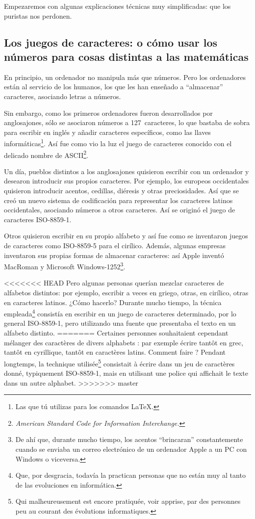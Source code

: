 Empezaremos con algunas explicaciones técnicas muy simplificadas: que los puristas nos perdonen.

\subsection{Los juegos de caracteres: o cómo usar los números para cosas distintas a las matemáticas}

En principio, un ordenador no manipula más que números. Pero los ordenadores están al servicio de los humanos, los que les han enseñado a \enquote{almacenar} caracteres, asociando letras a números.

Sin embargo, como los primeros ordenadores fueron desarrollados por anglosajones, sólo se asociaron números a 127~caracteres, lo que bastaba de sobra para escribir en inglés y añadir caracteres específicos, como las llaves informáticas\footnote{Las que tú utilizas para los comandos \LaTeX.}.  Así fue como vio la luz el juego de caracteres conocido con el delicado nombre de ASCII\footnote{\emph{\textenglish{American Standard Code for Information Interchange.}}}.

Un día, pueblos distintos a los anglosajones quisieron escribir con un ordenador y desearon introducir sus propios caracteres. Por ejemplo, los europeos occidentales quisieron introducir acentos, cedillas, diéresis y otras preciosidades. Así que se creó un nuevo sistema de codificación para representar los caracteres latinos occidentales, asociando números a otros caracteres. Así se originó el juego de caracteres  ISO-8859-1. 

Otros quisieron escribir en su propio alfabeto y así fue como se inventaron juegos de caracteres como ISO-8859-5 para el cirílico. Además, algunas empresas inventaron sus propias formas de almacenar caracteres:  así Apple inventó MacRoman y Microsoft Windows-1252\footnote{De ahí que, durante mucho tiempo, los acentos \enquote{brincaran} constantemente cuando se enviaba un correo electrónico de un ordenador Apple a un PC con Windows o viceversa.}. 

<<<<<<< HEAD
Pero algunas personas querían mezclar caracteres de alfabetos distintos: por ejemplo, escribir a veces en griego, otras, en cirílico, otras en caracteres latinos. ¿Cómo hacerlo? Durante mucho tiempo, la técnica empleada\footnote{Que, por desgracia, todavía la practican personas que no están muy al tanto de las evoluciones en informática.} consistía en escribir en un juego de caracteres determinado, por lo general ISO-8859-1, pero utilizando una fuente que presentaba el texto en un alfabeto distinto. 
=======
Certaines personnes souhaitaient cependant mélanger des caractères de divers alphabets : par exemple écrire tantôt en grec, tantôt en cyrillique, tantôt en caractères latins. Comment faire ? Pendant longtemps, la technique utilisée\footnote{Qui malheureusement est encore pratiquée, voir apprise, par des personnes peu au courant des évolutions informatiques.} consistait à écrire dans un jeu de caractères donné, typiquement ISO-8859-1, mais en utilisant une police qui affichait le texte dans un autre alphabet. 
>>>>>>> master


